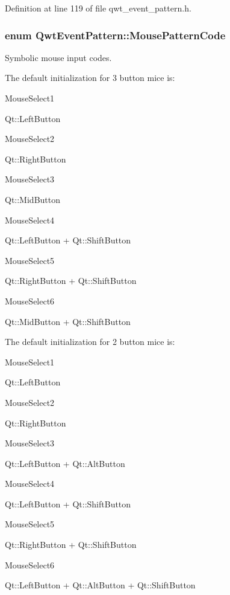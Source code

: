 Definition at line 119 of file qwt\-\_\-event\-\_\-pattern.\-h.

\hypertarget{class_qwt_event_pattern_af48dc808ac5e125eeed41a4c0285d1ea}{
\subsubsection[{Mouse\-Pattern\-Code}]{\setlength{\rightskip}{0pt plus 5cm}enum {\bf Qwt\-Event\-Pattern\-::\-Mouse\-Pattern\-Code}}}\label{class_qwt_event_pattern_af48dc808ac5e125eeed41a4c0285d1ea}


Symbolic mouse input codes. 

The default initialization for 3 button mice is\-:
\begin{DoxyItemize}
\item Mouse\-Select1\par
 Qt\-::\-Left\-Button
\item Mouse\-Select2\par
 Qt\-::\-Right\-Button
\item Mouse\-Select3\par
 Qt\-::\-Mid\-Button
\item Mouse\-Select4\par
 Qt\-::\-Left\-Button + Qt\-::\-Shift\-Button
\item Mouse\-Select5\par
 Qt\-::\-Right\-Button + Qt\-::\-Shift\-Button
\item Mouse\-Select6\par
 Qt\-::\-Mid\-Button + Qt\-::\-Shift\-Button
\end{DoxyItemize}

The default initialization for 2 button mice is\-:
\begin{DoxyItemize}
\item Mouse\-Select1\par
 Qt\-::\-Left\-Button
\item Mouse\-Select2\par
 Qt\-::\-Right\-Button
\item Mouse\-Select3\par
 Qt\-::\-Left\-Button + Qt\-::\-Alt\-Button
\item Mouse\-Select4\par
 Qt\-::\-Left\-Button + Qt\-::\-Shift\-Button
\item Mouse\-Select5\par
 Qt\-::\-Right\-Button + Qt\-::\-Shift\-Button
\item Mouse\-Select6\par
 Qt\-::\-Left\-Button + Qt\-::\-Alt\-Button + Qt\-::\-Shift\-Button
\end{DoxyItemize}

